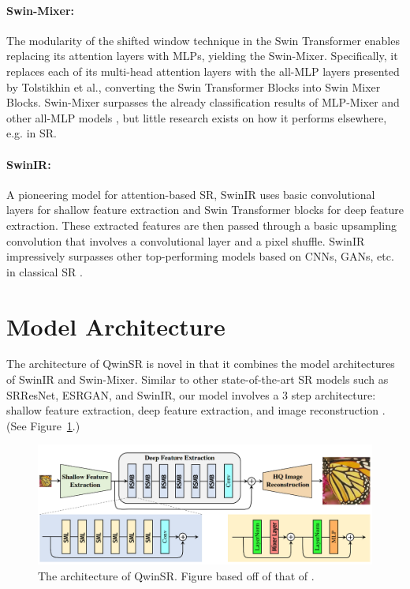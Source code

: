 \documentclass{article}
\begin{document}
\paragraph{Swin-Mixer:} The modularity of the shifted window technique in the Swin Transformer enables replacing its attention layers with MLPs, yielding the Swin-Mixer. Specifically, it replaces each of its multi-head attention layers with the all-MLP layers presented by Tolstikhin et al., converting the Swin Transformer Blocks into Swin Mixer Blocks. Swin-Mixer surpasses the already classification results of MLP-Mixer and other all-MLP models \citep{SwinTransformer,MLPMixer}, but little research exists on how it performs elsewhere, e.g. in SR.

\paragraph{SwinIR:} A pioneering model for attention-based SR, SwinIR uses basic convolutional layers for shallow feature extraction and Swin Transformer blocks for deep feature extraction. These extracted features are then passed through a basic upsampling convolution that involves a convolutional layer and a pixel shuffle. SwinIR impressively surpasses other top-performing models based on CNNs, GANs, etc. in classical SR \citep{SwinIR}.

\section{Model Architecture}

The architecture of QwinSR is novel in that it combines the model architectures of SwinIR and Swin-Mixer. Similar to other state-of-the-art SR models such as SRResNet, ESRGAN, and SwinIR, our model involves a 3 step architecture: shallow feature extraction, deep feature extraction, and image reconstruction \citep{SwinIR, ESRGAN}. (See Figure~\ref{fig:architecture}.)

\begin{figure}
    \centering
    \includegraphics[width=\textwidth]{qwinir-architecture.png}
    \caption{The architecture of QwinSR. Figure based off of that of \citet{SwinIR}.}
    \label{fig:architecture}
\end{figure}
\end{document}
